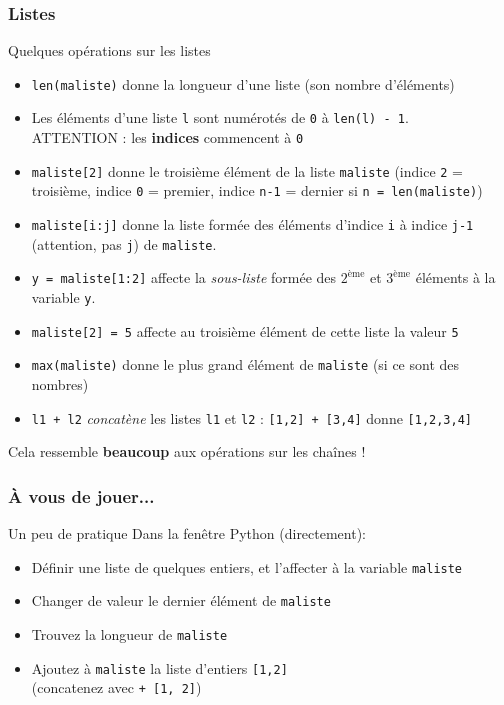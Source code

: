 \documentclass{beamer}
\newcommand{\mypause}{~}
\newcommand{\pyth}{{\sc Python}}
\newcommand{\prog}[1]{\alert{\texttt{#1}}}
\begin{document}
\frame
{
\frametitle{Listes}
\begin{block}{Quelques opérations sur les listes}\mypause{}
  {\footnotesize
\begin{itemize}
\item \prog{len(maliste)} donne la longueur d'une liste (son nombre d'éléments)\mypause{}
\item Les éléments d'une liste \prog{l} sont numérotés de \prog{0} à \prog{len(l) - 1}.\\
  ATTENTION : les \textbf{indices} commencent à \prog{0}\mypause{}
\item \prog{maliste[2]} donne le troisième élément de la liste \prog{maliste} (indice \prog{2} = troisième, indice \prog{0} = premier, indice \prog{n-1} = dernier si \prog{n = len(maliste)})\mypause{}
\item \prog{maliste[i:j]} donne la liste formée des éléments d'indice \prog{i}
à indice \prog{j-1} (attention, pas \prog{j}) de \prog{maliste}. \mypause{}
\item \prog{y = maliste[1:2]} affecte la {\em sous-liste} formée des $2^{\text{ème}}$ et $3^{\text{ème}}$ éléments à la variable \prog{y}.\mypause{}
\item \prog{maliste[2] = 5} affecte au troisième élément de cette liste la valeur \prog{5}\mypause{}
\item \prog{max(maliste)} donne le plus grand élément de \prog{maliste} (si ce sont des
nombres)\mypause{}
\item \prog{l1 + l2} {\em concatène} les listes \prog{l1} et \prog{l2} : \prog{[1,2] + [3,4]} donne \prog{[1,2,3,4]}
\end{itemize}
}
\end{block}

Cela ressemble \textbf{beaucoup} aux opérations sur les chaînes !
}

\frame
{
\frametitle{À vous de jouer...}
\begin{block}{Un peu de pratique}
Dans la fenêtre \pyth{} (directement):
\begin{itemize}
\item Définir une liste de quelques entiers, et l'affecter à la variable \prog{maliste}
\item Changer de valeur le dernier élément de \prog{maliste}
\item Trouvez la longueur de \prog{maliste}
\item Ajoutez à \prog{maliste} la liste d'entiers \prog{[1,2]} \\
  (concatenez avec \prog{+ [1, 2]})
\end{itemize}
\end{block}
}
\end{document}
